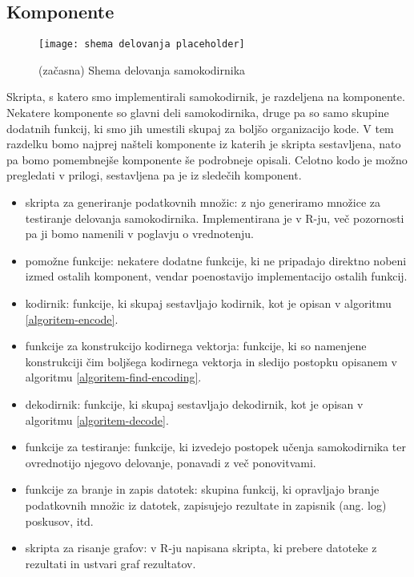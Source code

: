 \documentclass[12pt,a4paper]{article}
\begin{document}
\subsection{Komponente}

\begin{figure}[h!]

	\begin{center}
	\texttt{[image: shema delovanja placeholder]}
	\end{center}
	
	\caption{(začasna) Shema delovanja samokodirnika}
\end{figure}

Skripta, s katero smo implementirali samokodirnik, je razdeljena na komponente.
Nekatere komponente so glavni deli samokodirnika, druge pa so samo skupine dodatnih funkcij, ki smo jih umestili skupaj za boljšo organizacijo kode.
V tem razdelku bomo najprej našteli komponente iz katerih je skripta sestavljena, nato pa bomo pomembnejše komponente še podrobneje opisali.
Celotno kodo je možno pregledati v prilogi, sestavljena pa je iz sledečih komponent. %

\begin{itemize}
	\item skripta za generiranje podatkovnih množic: z njo generiramo množice za testiranje delovanja samokodirnika. 
	Implementirana je v R-ju, več pozornosti pa ji bomo namenili v poglavju o vrednotenju. %
	
	\item pomožne funkcije: nekatere dodatne funkcije, ki ne pripadajo direktno nobeni izmed ostalih komponent, 
	vendar poenostavijo implementacijo ostalih funkcij.

	\item kodirnik: funkcije, ki skupaj sestavljajo kodirnik, kot je opisan v algoritmu \ref{algoritem-encode}.

	\item funkcije za konstrukcijo kodirnega vektorja: 
	funkcije, ki so namenjene konstrukciji čim boljšega kodirnega vektorja in sledijo postopku opisanem v algoritmu \ref{algoritem-find-encoding}.

	\item dekodirnik: funkcije, ki skupaj sestavljajo dekodirnik, kot je opisan v algoritmu \ref{algoritem-decode}.

	\item funkcije za testiranje: funkcije, ki izvedejo postopek učenja samokodirnika ter ovrednotijo njegovo delovanje, ponavadi z več ponovitvami.

	\item funkcije za branje in zapis datotek: skupina funkcij, ki opravljajo branje podatkovnih množic iz datotek, zapisujejo rezultate in zapisnik (ang. log) poskusov, itd.

	\item skripta za risanje grafov: v R-ju napisana skripta, ki prebere datoteke z rezultati in ustvari graf rezultatov.
\end{itemize}
\end{document}
